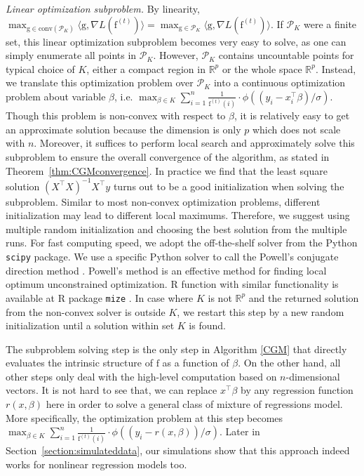 \documentclass[11pt]{article}
\numberwithin{equation}{section}
\newcommand{\RS}{\mathbb{R}}
\newcommand{\PS}{\mathcal{P}}
\newcommand{\T}{ \top }
\newcommand{\fv}{\mathrm{f}}
\newcommand{\gv}{\mathrm{g}}
\begin{document}
\emph{Linear optimization subproblem.} By linearity, $\max_{{\gv} \in \mathrm{conv}(\PS_K) }\langle {\gv}, \nabla L(\fv^{(t)}) \rangle = \max_{{\gv} \in\PS_K }\langle {\gv}, \nabla L(\fv^{(t)}) \rangle$. If $\PS_K$ were a finite set, this linear optimization subproblem becomes very easy to solve, as one can simply enumerate all points in $\PS_K$. However, $\PS_K$ contains uncountable points for typical choice of $K$, either a compact region in $\RS^p$ or the whole space $\RS^p$. Instead, we translate this optimization problem over $\PS_K$ into a continuous optimization problem about variable $\beta$, i.e. $\max_{\beta \in K} \sum_{i=1}^n \frac{1}{\fv^{(t)}(i)} \cdot \phi((y_i -x_i^\T\beta)/\sigma)$. Though this problem is non-convex with respect to $\beta$, it is relatively easy to get an approximate solution because the dimension is only $p$ which does not scale with $n$. Moreover, it suffices to perform local search and approximately solve this subproblem to ensure the overall convergence of the algorithm, as stated in Theorem~\ref{thm:CGMconvergence}. In practice we find that the least square solution $(X^\T X)^{-1}X^\T y$ turns out to be a good initialization when solving the subproblem. Similar to most non-convex optimization problems, different initialization may lead to different local maximums. Therefore, we suggest using multiple random initialization and choosing the best solution from the multiple runs. For fast computing speed, we adopt the off-the-shelf solver from the Python \texttt{scipy} package. We use a specific Python solver to call the Powell's conjugate direction method \citep{powell1964efficient}. Powell's method is an effective method for finding local optimum unconstrained optimization. R function with similar functionality is available at R package \texttt{mize} \citep{rmize}. In case where $K$ is not $\RS^p$ and the returned solution from the non-convex solver is outside $K$, we restart this step by a new random initialization until a solution within set $K$ is found.

The subproblem solving step is the only step in Algorithm \ref{CGM} that directly evaluates the intrinsic structure of $\fv$ as a function of $\beta$. On the other hand, all other steps only deal with the high-level computation based on $n$-dimensional vectors. It is not hard to see that, we can replace $x^\T\beta$ by any regression function $r(x,\beta)$ here in order to solve a general class of mixture of regressions model. More specifically, the optimization problem at this step becomes $\max_{\beta \in K} \sum_{i=1}^n \frac{1}{\fv^{(t)}(i)} \cdot \phi((y_i -r(x,\beta))/\sigma)$.  Later in Section~\ref{section:simulateddata}, our simulations show that this approach indeed works for nonlinear regression models too.
\end{document}
